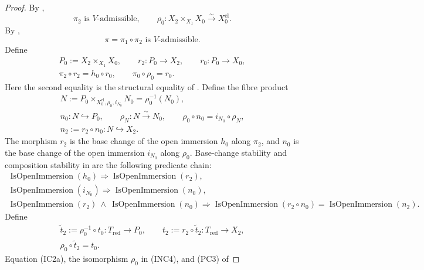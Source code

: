 \begin{proof}
  By ,
  \[
    \pi_2\text{ is }V\text{-admissible},\qquad
    \rho_0\colon X_2\times_{X_1}X_0\xrightarrow{\sim}X_0^{\mathrm{el}}.
  \]
  By ,
  \[
    \pi=\pi_1\circ\pi_2\text{ is }V\text{-admissible}.
  \]
  Define
  \[
  \begin{gathered}
    P_0:=X_2\times_{X_1}X_0,
    \qquad
    r_2\colon P_0\to X_2,
    \qquad
    r_0\colon P_0\to X_0,\\
    \pi_2\circ r_2=h_0\circ r_0,
    \qquad
    \pi_0\circ\rho_0=r_0.
  \end{gathered}
  \]
  Here the second equality is the structural equality of
  .  Define the fibre product
  \[
  \begin{gathered}
    N:=P_0\times_{X_0^{\mathrm{el}},\rho_0,i_{N_0}}N_0
       =\rho_0^{-1}(N_0),\\
    n_0\colon N\hookrightarrow P_0,
    \qquad
    \rho_N\colon N\xrightarrow{\sim}N_0,
    \qquad
    \rho_0\circ n_0=i_{N_0}\circ\rho_N,\\
    n_2:=r_2\circ n_0\colon N\hookrightarrow X_2.
  \end{gathered}
  \]
  The morphism $r_2$ is the base change of the open immersion $h_0$ along
  $\pi_2$, and $n_0$ is the base change of the open immersion $i_{N_0}$
  along $\rho_0$.  Base-change stability and composition stability in
   are the following predicate
  chain:
  \[
  \begin{gathered}
    \operatorname{IsOpenImmersion}(h_0)
      \Longrightarrow\operatorname{IsOpenImmersion}(r_2),\\
    \operatorname{IsOpenImmersion}(i_{N_0})
      \Longrightarrow\operatorname{IsOpenImmersion}(n_0),\\
    \operatorname{IsOpenImmersion}(r_2)\ \wedge\
      \operatorname{IsOpenImmersion}(n_0)
      \Longrightarrow
      \operatorname{IsOpenImmersion}(r_2\circ n_0)
      =\operatorname{IsOpenImmersion}(n_2).                     
  \end{gathered} \tag{IC3a}
  \]
  Define
  \[
  \begin{gathered}
    \widetilde t_2:=\rho_0^{-1}\circ t_0
      \colon T_{\mathrm{red}}\to P_0,
    \qquad
    t_2:=r_2\circ\widetilde t_2
      \colon T_{\mathrm{red}}\to X_2,\\
    \rho_0\circ\widetilde t_2=t_0.
  \end{gathered}
  \]
  Equation (IC2a), the isomorphism $\rho_0$ in (INC4), and (PC3) of

\end{proof}
